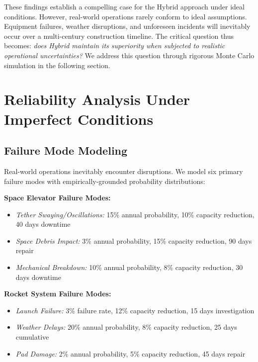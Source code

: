 \documentclass[12pt]{article}
\begin{document}
	These findings establish a compelling case for the Hybrid approach under ideal conditions. However, real-world operations rarely conform to ideal assumptions. Equipment failures, weather disruptions, and unforeseen incidents will inevitably occur over a multi-century construction timeline. The critical question thus becomes: \textit{does Hybrid maintain its superiority when subjected to realistic operational uncertainties?} We address this question through rigorous Monte Carlo simulation in the following section.
	
	\section{Reliability Analysis Under Imperfect Conditions}
	
	\subsection{Failure Mode Modeling}
	
	Real-world operations inevitably encounter disruptions. We model six primary failure modes with empirically-grounded probability distributions:
	
	\textbf{Space Elevator Failure Modes:}
	\begin{itemize}[leftmargin=2em, itemsep=1pt]
		\item \textit{Tether Swaying/Oscillations:} 15\% annual probability, 10\% capacity reduction, 40 days downtime
		\item \textit{Space Debris Impact:} 3\% annual probability, 15\% capacity reduction, 90 days repair
		\item \textit{Mechanical Breakdown:} 10\% annual probability, 8\% capacity reduction, 30 days downtime
	\end{itemize}
	
	\textbf{Rocket System Failure Modes:}
	\begin{itemize}[leftmargin=2em, itemsep=1pt]
		\item \textit{Launch Failure:} 3\% failure rate, 12\% capacity reduction, 15 days investigation
		\item \textit{Weather Delays:} 20\% annual probability, 8\% capacity reduction, 25 days cumulative
		\item \textit{Pad Damage:} 2\% annual probability, 5\% capacity reduction, 45 days repair
	\end{itemize}
	
\end{document}

